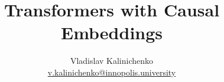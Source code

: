\documentclass{article}
\title{Transformers with Causal Embeddings}
\author{Vladislav Kalinichenko\\ \url{v.kalinichenko@innopolis.university}}
\begin{document}
\maketitle

\begin{abstract}
\end{abstract}




{}

\end{document}
